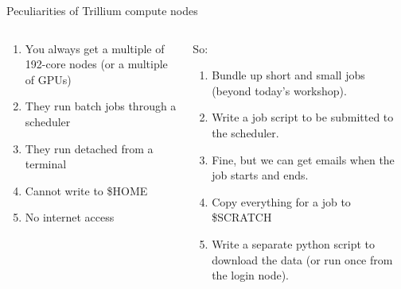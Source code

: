 \documentclass[
  10pt,
  ignorenonframetext,
  aspectratio=169]{beamer}
\begin{document}
\begin{frame}{Peculiarities of Trillium compute nodes}
\label{peculiarities-of-trillium-compute-nodes}
\begin{columns}[T]
\begin{column}{0.31\linewidth}\setlength{\parskip}{0.5\baselineskip}
\vspace{\baselineskip}

\begin{enumerate}
\item
  You always get a multiple of 192-core nodes (or a multiple of GPUs)

  \pause
\item
  They run batch jobs through a scheduler

  \pause
\item
  They run detached from a terminal

  \pause
\item
  Cannot write to \$HOME

  \pause
\item
  No internet access

  \pause
\end{enumerate}
\end{column}

\begin{column}{0.62\linewidth}\setlength{\parskip}{0.5\baselineskip}
So:

\begin{enumerate}
\item
  Bundle up short and small jobs (beyond today's workshop).\\
  \vspace{\baselineskip} \vspace{\baselineskip}

  \pause
\item
  Write a job script to be submitted to the scheduler. \vspace{\baselineskip}

  \pause
\item
  Fine, but we can get emails when the job starts and ends. \vspace{\baselineskip}

  \pause
\item
  Copy everything for a job to \$SCRATCH

  \pause
\item
  Write a separate python script to download the data (or run once from the login node).
\end{enumerate}
\end{column}
\end{columns}
\end{frame}
\end{document}
